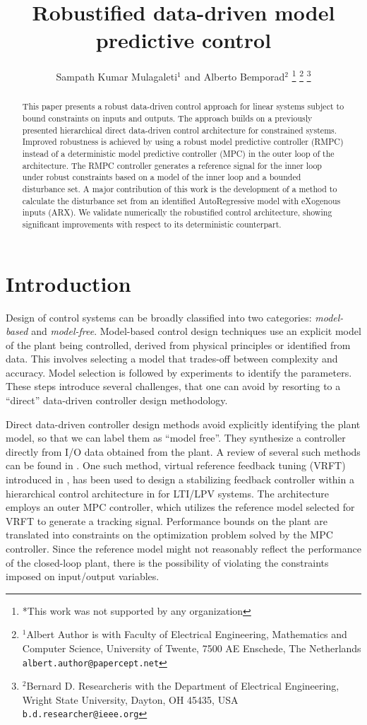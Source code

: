 \documentclass[letterpaper, 10 pt, conference]{ieeeconf}  %
\title{\LARGE \bf
Robustified data-driven model predictive control
}
\author{Sampath Kumar Mulagaleti$^{1}$ and Alberto Bemporad$^{2}$%
\thanks{*This work was not supported by any organization}%
\thanks{$^{1}$Albert Author is with Faculty of Electrical Engineering, Mathematics and Computer Science,
        University of Twente, 7500 AE Enschede, The Netherlands
        {\tt\small albert.author@papercept.net}}%
\thanks{$^{2}$Bernard D. Researcheris with the Department of Electrical Engineering, Wright State University,
        Dayton, OH 45435, USA
        {\tt\small b.d.researcher@ieee.org}}%
}
\begin{document}
\maketitle
\thispagestyle{empty}
\pagestyle{empty}


\begin{abstract}

This paper presents a robust data-driven control approach for linear systems subject to bound constraints on inputs and outputs.
 The approach builds on a previously presented hierarchical direct data-driven control architecture for constrained systems. Improved robustness is achieved by using a robust model predictive controller (RMPC) instead of a deterministic model predictive controller (MPC) in the outer loop of the architecture. The RMPC controller generates a reference signal for the inner loop under robust constraints based on a model of the inner loop and a bounded disturbance set. A major contribution of this work is the development of a method to calculate the disturbance set from an identified AutoRegressive model with eXogenous inputs (ARX). We validate numerically the robustified control architecture, showing significant improvements with respect to its deterministic counterpart.

\end{abstract}


\section{Introduction}
Design of control systems can be broadly classified into two categories: \emph{model-based} and \emph{model-free}. Model-based control design techniques use an explicit model of the plant being controlled, derived from physical principles or identified from data. This involves selecting a model that trades-off between complexity and accuracy. Model selection is followed by experiments to identify the parameters. These steps introduce several challenges, that one
can avoid by resorting to a ``direct'' data-driven controller design methodology.

Direct data-driven controller design methods avoid explicitly identifying the plant model, so that we can label them as ``model free''. They synthesize a controller directly from I/O data obtained from the plant. A review of several such methods can be found in \cite{HOU20133}. One such method, virtual reference feedback tuning (VRFT) introduced in \cite{CAMPI20021337}, has been used to design a stabilizing feedback controller within a hierarchical control architecture in \cite{7932940} for LTI/LPV systems. The architecture employs an outer MPC controller, which utilizes the reference model selected for VRFT to generate a tracking signal. Performance bounds on the plant are translated into constraints on the optimization problem solved by the MPC controller. Since the reference model might not reasonably reflect the performance of the closed-loop plant, there is the possibility of violating the constraints imposed on input/output variables. 
\end{document}
